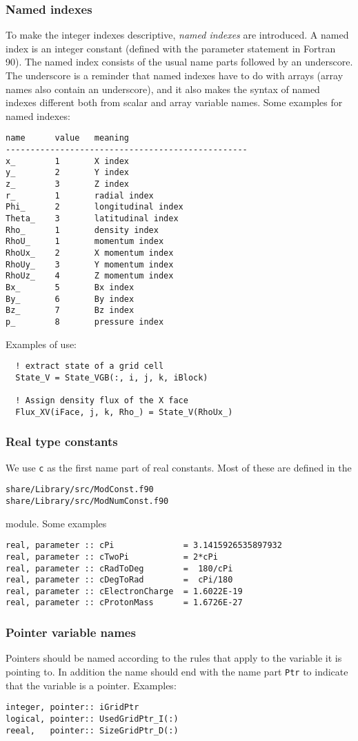 \documentclass{article}
\begin{document}
\subsubsection{Named indexes \label{sec:named}}

To make the integer indexes descriptive, 
{\it named indexes} are introduced. A named index is
an integer constant (defined with the parameter statement in Fortran 90).
The named index consists of the usual name parts followed by
an underscore. The underscore is a reminder that named indexes
have to do with arrays (array names also contain an underscore), 
and it also makes the syntax of named
indexes different both from scalar and array variable names. 
Some examples for named indexes:
\begin{verbatim}
name      value   meaning
-------------------------------------------------
x_        1       X index
y_        2       Y index
z_        3       Z index
r_        1       radial index
Phi_      2       longitudinal index
Theta_    3       latitudinal index
Rho_      1       density index
RhoU_     1       momentum index
RhoUx_    2       X momentum index
RhoUy_    3       Y momentum index
RhoUz_    4       Z momentum index
Bx_       5       Bx index
By_       6       By index
Bz_       7       Bz index
p_        8       pressure index
\end{verbatim}
Examples of use:
\begin{verbatim}
  ! extract state of a grid cell
  State_V = State_VGB(:, i, j, k, iBlock)

  ! Assign density flux of the X face
  Flux_XV(iFace, j, k, Rho_) = State_V(RhoUx_)
\end{verbatim}

\subsubsection{Real type constants}

We use {\tt c} as the first name part of real constants. Most
of these are defined in the
\begin{verbatim}
share/Library/src/ModConst.f90
share/Library/src/ModNumConst.f90
\end{verbatim}
module. Some examples
\begin{verbatim}
real, parameter :: cPi              = 3.1415926535897932
real, parameter :: cTwoPi           = 2*cPi
real, parameter :: cRadToDeg        =  180/cPi
real, parameter :: cDegToRad        =  cPi/180
real, parameter :: cElectronCharge  = 1.6022E-19
real, parameter :: cProtonMass      = 1.6726E-27
\end{verbatim}

\subsubsection{Pointer variable names}

Pointers should be named according to the rules that apply to the variable
it is pointing to. In addition the name should end with the name part 
{\tt Ptr} to indicate that the variable is a pointer. Examples:
\begin{verbatim}
integer, pointer:: iGridPtr
logical, pointer:: UsedGridPtr_I(:)
reeal,   pointer:: SizeGridPtr_D(:)
\end{verbatim}
\end{document}
